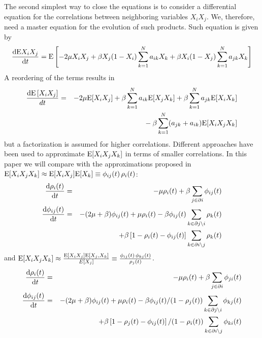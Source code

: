 The second simplest way to close the equations is to consider a differential equation for the correlations between neighboring variables $X_i X_j$. We, therefore, need a master equation for the evolution of such products. Such equation is given by
\[ \frac{\mathrm{d} \mathrm{E} X_i X_j}{\mathrm{d} t} = \mathrm{E} \left[ -2\mu X_i X_j +\beta X_j (1-X_i )\sum_{k=1}^N a_{ik} X_k + \beta X_i (1-X_j )\sum_{k=1}^N a_{jk} X_k  \right]  
\]
A reordering of the terms results in 
\begin{eqnarray}
\frac{\ud \E\left[  X_{i}X_{j}\right]  }{dt}  
&  =& -2\mu \E[X_{i}X_{j}] + \beta\sum_{k=1}^{N} a_{ik}\E[X_{j}X_{k}] + \beta\sum_{k=1}^{N} a_{jk}\E[X_{i}X_{k}]  \nonumber \\
&& \phantom{-2\mu \E[X_{i}X_{j}]} -\beta\sum_{k=1}^{N}(a_{jk} +a_{ik}) \E[X_{i}X_{j}X_{k}]
\label{eq:EXiXidt} 
\end{eqnarray}
but a factorization is assumed for higher correlations. Different approaches have been used to approximate $\mathrm{E}[X_i X_j X_k]$ in terms of smaller correlations. In this paper we will compare with the approximations proposed in \cite{cator2012second} $\mathrm{E}[X_i X_j X_k] \approx \mathrm{E}[X_i X_j]\mathrm{E}[X_k] \equiv \phi_{ij}(t) \, \rho_i(t)$:
\begin{eqnarray}
 \frac{\mathrm{d}\rho_{i}(t)}{\mathrm{d} t} &=& -\mu \rho_{i}(t) + \beta \sum_{j \in \partial i} \phi_{ij}(t)  \label{eq:rhoi_dt_PBMF} \\
\frac{\mathrm{d} \phi_{ij}(t)}{\mathrm{d} t} &=& -(2\mu+\beta) \phi_{ij}(t) + \mu \rho_i(t)-  \beta \phi_{ij}(t) \sum_{k \in \partial j \setminus i} \rho_{k}(t)  \nonumber \\ & & + 
\beta \left[ 1 - \rho_{i}(t) - \phi_{ij}(t) \right] \sum_{k \in \partial i \setminus j} \rho_{k}(t) \label{eq:joint_PBMF1}
\end{eqnarray}
and \cite{mata2013pair} $\mathrm{E}[X_i X_j X_k] \approx \frac{\mathrm{E}[X_i X_j]\mathrm{E}[X_j,X_k]}{E[X_j]} \equiv \frac{\phi_{ij}(t) \, \phi_{kj}(t)}{\rho_{j}(t)}$.
\begin{eqnarray}
 \frac{\mathrm{d}\rho_{i}(t)}{\mathrm{d} t} &=& -\mu \rho_{i}(t) + \beta \sum_{j \in \partial i} \phi_{ji}(t)  \nonumber \\
\frac{\mathrm{d} \phi_{ij}(t)}{\mathrm{d} t} &=& -(2\mu+\beta) \phi_{ij}(t) + \mu \rho_i(t)  -  \beta \phi_{ij}(t)/(1-\rho_{j}(t)) \sum_{k \in \partial j \setminus i} \phi_{kj}(t)  \nonumber \\ & & + 
\beta \left[ 1 - \rho_{j}(t) - \phi_{ij}(t) \right]/(1-\rho_{i}(t)) \sum_{k \in \partial i \setminus j} \phi_{ki}(t)
\label{eq:joint_PBMF2}
\end{eqnarray}

